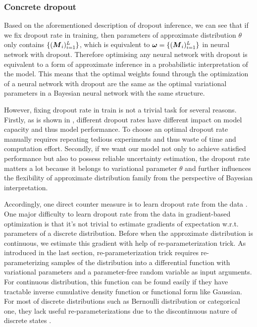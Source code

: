 \subsubsection{Concrete dropout}
Based on the aforementioned description of dropout inference, we can see that if we fix dropout rate in training, then parameters of approximate distribution $\theta$ only contains $\{(\boldsymbol M_{i})^L_{i=1}\}$, which is equivalent to $\boldsymbol \omega = \{(\boldsymbol M_{i})^L_{i=1}\}$ in neural network with dropout. Therefore optimising any neural network with dropout is equivalent to a form of approximate inference in a probabilistic interpretation of the model. This means that the optimal weights found through the optimization of a neural network with dropout are the same as the optimal variational parameters in a Bayesian neural network with the same structure. 

However, fixing dropout rate in train is not a trivial task for several reasons. Firstly, as is shown in \cite{srivastava2014dropout}, different dropout rates have different impact on model capacity and thus model performance. To choose an optimal dropout rate manually requires repeating tedious experiments and thus waste of time and computation effort. Secondly, if we want our model not only to achieve satisfied performance but also to possess reliable uncertainty estimation, the dropout rate matters a lot because it belongs to variational parameter $\theta$ and further influences the flexibility of approximate distribution family from the perspective of Bayesian interpretation.

Accordingly, one direct counter measure is to learn dropout rate from the data \cite{gal2017concrete}. One major difficulty to learn dropout rate from the data in gradient-based optimization is that it's not trivial to estimate gradients of expectation w.r.t. parameters of a discrete distribution. Before when the approximate distribution is continuous, we estimate this gradient with help of re-parameterization trick. As introduced in the last section, re-parameterization trick requires re-parameterizing samples of the distribution into a differential function with variational parameters and a parameter-free random variable as input arguments. For continuous distribution, this function can be found easily if they have tractable inverse cumulative density function or functional form like Gaussian\cite{kingma2013auto}. For most of discrete distributions such as Bernoulli distribution or categorical one, they lack useful re-parameterizations
due to the discontinuous nature of discrete states \cite{maddison2016concrete}. 

